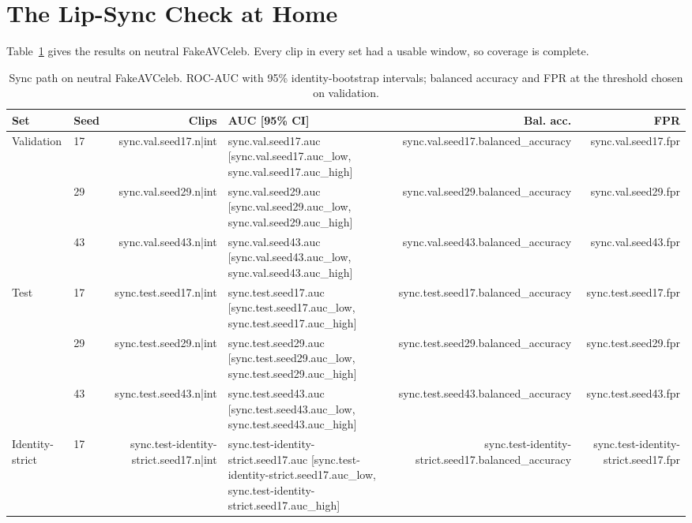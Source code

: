 \section{The Lip-Sync Check at Home}
\label{sec:r-home}

Table~\ref{tab:sync-indomain} gives the results on neutral FakeAVCeleb. Every
clip in every set had a usable window, so coverage is complete.

\begin{table}[ht]
    \centering
    \small
    \caption{Sync path on neutral FakeAVCeleb. ROC-AUC with 95\% identity-bootstrap intervals; balanced accuracy and FPR at the threshold chosen on validation.}
    \label{tab:sync-indomain}
    \begin{tabular}{l l r l r r}
        \toprule
        \textbf{Set} & \textbf{Seed} & \textbf{Clips} & \textbf{AUC [95\% CI]} & \textbf{Bal. acc.} & \textbf{FPR} \\
        \midrule
        Validation & 17 & {{sync.val.seed17.n|int}} & {{sync.val.seed17.auc}} [{{sync.val.seed17.auc_low}}, {{sync.val.seed17.auc_high}}] & {{sync.val.seed17.balanced_accuracy}} & {{sync.val.seed17.fpr}} \\
                   & 29 & {{sync.val.seed29.n|int}} & {{sync.val.seed29.auc}} [{{sync.val.seed29.auc_low}}, {{sync.val.seed29.auc_high}}] & {{sync.val.seed29.balanced_accuracy}} & {{sync.val.seed29.fpr}} \\
                   & 43 & {{sync.val.seed43.n|int}} & {{sync.val.seed43.auc}} [{{sync.val.seed43.auc_low}}, {{sync.val.seed43.auc_high}}] & {{sync.val.seed43.balanced_accuracy}} & {{sync.val.seed43.fpr}} \\
        \midrule
        Test & 17 & {{sync.test.seed17.n|int}} & {{sync.test.seed17.auc}} [{{sync.test.seed17.auc_low}}, {{sync.test.seed17.auc_high}}] & {{sync.test.seed17.balanced_accuracy}} & {{sync.test.seed17.fpr}} \\
             & 29 & {{sync.test.seed29.n|int}} & {{sync.test.seed29.auc}} [{{sync.test.seed29.auc_low}}, {{sync.test.seed29.auc_high}}] & {{sync.test.seed29.balanced_accuracy}} & {{sync.test.seed29.fpr}} \\
             & 43 & {{sync.test.seed43.n|int}} & {{sync.test.seed43.auc}} [{{sync.test.seed43.auc_low}}, {{sync.test.seed43.auc_high}}] & {{sync.test.seed43.balanced_accuracy}} & {{sync.test.seed43.fpr}} \\
        \midrule
        Identity-strict & 17 & {{sync.test-identity-strict.seed17.n|int}} & {{sync.test-identity-strict.seed17.auc}} [{{sync.test-identity-strict.seed17.auc_low}}, {{sync.test-identity-strict.seed17.auc_high}}] & {{sync.test-identity-strict.seed17.balanced_accuracy}} & {{sync.test-identity-strict.seed17.fpr}} \\

\end{tabular}
\end{table}
